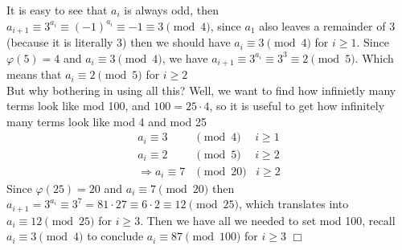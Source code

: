 \begin{solution}[only 87]
    It is easy to see that $a_i$ is always odd, then $a_{i+1} \equiv 3^{a_i} \equiv(-1)^{a_i} \equiv -1 \equiv 3\pmod 4$, since $a_1$ also leaves a remainder of 3 (because it is literally 3) then we should have $a_i \equiv 3 \pmod4$  for $i \geq 1$.
    Since $\varphi(5)=4$ and $a_i \equiv 3 \pmod4$, we have $a_{i+1} \equiv 3^{a_i} \equiv 3^3 \equiv 2 \pmod 5$. Which means that $a_i \equiv 2 \pmod 5$ for $i \geq 2$ \\
    But why bothering in using all this? Well, we want to find how infinietly many terms look like mod 100, and $100 = 25 \cdot 4$, so it is useful to get how infinitely many terms look like mod 4 and mod 25
    \begin{align*}
        a_i \equiv 3 &\pmod4 \hspace{15pt}  i\geq 1\\
        a_i \equiv 2 &\pmod5 \hspace{15pt}  i\geq 2 \\
        \Rightarrow a_i \equiv 7 &\pmod {20} \hspace{10pt} i\geq 2
    \end{align*}
    Since $\varphi(25)=20$ and $a_i \equiv 7 \pmod {20}$ then $a_{i+1} = 3^{a_i} \equiv 3^7 = 81 \cdot 27 \equiv6\cdot2 \equiv 12 \pmod{25}$, which translates into $a_i \equiv 12 \pmod{25}$ for $i \geq 3$. Then we have all we needed to set mod 100, recall $a_i \equiv 3 \pmod4$ to conclude $a_i \equiv 87 \pmod{100}$ for $i \geq 3$ $\Box$
\end{solution}
    
